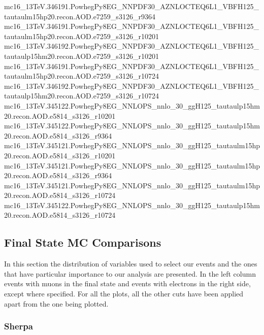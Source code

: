 {mc16\_13TeV.346191.PowhegPy8EG\_NNPDF30\_AZNLOCTEQ6L1\_VBFH125\_tautaulm15hp20.recon.AOD.e7259\_s3126\_r9364\newline  
mc16\_13TeV.346191.PowhegPy8EG\_NNPDF30\_AZNLOCTEQ6L1\_VBFH125\_tautaulm15hp20.recon.AOD.e7259\_s3126\_r10201\newline  
mc16\_13TeV.346192.PowhegPy8EG\_NNPDF30\_AZNLOCTEQ6L1\_VBFH125\_tautaulp15hm20.recon.AOD.e7259\_s3126\_r10201\newline  
mc16\_13TeV.346191.PowhegPy8EG\_NNPDF30\_AZNLOCTEQ6L1\_VBFH125\_tautaulm15hp20.recon.AOD.e7259\_s3126\_r10724\newline  
mc16\_13TeV.346192.PowhegPy8EG\_NNPDF30\_AZNLOCTEQ6L1\_VBFH125\_tautaulp15hm20.recon.AOD.e7259\_s3126\_r10724\newline  
mc16\_13TeV.345122.PowhegPy8EG\_NNLOPS\_nnlo\_30\_ggH125\_tautaulp15hm20.recon.AOD.e5814\_s3126\_r10201\newline  
mc16\_13TeV.345122.PowhegPy8EG\_NNLOPS\_nnlo\_30\_ggH125\_tautaulp15hm20.recon.AOD.e5814\_s3126\_r9364\newline  
mc16\_13TeV.345121.PowhegPy8EG\_NNLOPS\_nnlo\_30\_ggH125\_tautaulm15hp20.recon.AOD.e5814\_s3126\_r10201\newline  
mc16\_13TeV.345121.PowhegPy8EG\_NNLOPS\_nnlo\_30\_ggH125\_tautaulm15hp20.recon.AOD.e5814\_s3126\_r9364\newline  
mc16\_13TeV.345121.PowhegPy8EG\_NNLOPS\_nnlo\_30\_ggH125\_tautaulm15hp20.recon.AOD.e5814\_s3126\_r10724\newline  
mc16\_13TeV.345122.PowhegPy8EG\_NNLOPS\_nnlo\_30\_ggH125\_tautaulp15hm20.recon.AOD.e5814\_s3126\_r10724}	
\subsection{Final State MC Comparisons}\label{DistComparisons}
In this section the distribution of variables used to select our events and the ones that have particular importance to our analysis are presented. In the left column events with muons in the final state and events with electrons in the right side, except where specified. For all the plots, all the other cuts have been applied apart from the one being plotted.
\subsubsection{Sherpa}



